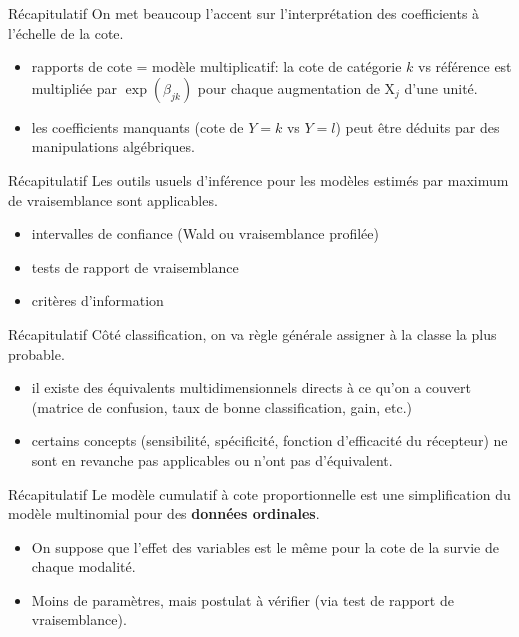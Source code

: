 \documentclass[
  ignorenonframetext,
]{beamer}
\providecommand{\tightlist}{%
  \setlength{\itemsep}{0pt}\setlength{\parskip}{0pt}}\usepackage{longtable,booktabs,array}
\begin{document}
\begin{frame}{Récapitulatif}
\protect\hypertarget{ruxe9capitulatif-2}{}
On met beaucoup l'accent sur l'interprétation des coefficients à
l'échelle de la cote.

\begin{itemize}
\tightlist
\item
  rapports de cote = modèle multiplicatif: la cote de catégorie \(k\) vs
  référence est multipliée par \(\exp(\beta_{jk})\) pour chaque
  augmentation de \(\mathrm{X}_j\) d'une unité.
\item
  les coefficients manquants (cote de \(Y=k\) vs \(Y=l\)) peut être
  déduits par des manipulations algébriques.
\end{itemize}
\end{frame}

\begin{frame}{Récapitulatif}
\protect\hypertarget{ruxe9capitulatif-3}{}
Les outils usuels d'inférence pour les modèles estimés par maximum de
vraisemblance sont applicables.

\begin{itemize}
\tightlist
\item
  intervalles de confiance (Wald ou vraisemblance profilée)
\item
  tests de rapport de vraisemblance
\item
  critères d'information
\end{itemize}
\end{frame}

\begin{frame}{Récapitulatif}
\protect\hypertarget{ruxe9capitulatif-4}{}
Côté classification, on va règle générale assigner à la classe la plus
probable.

\begin{itemize}
\tightlist
\item
  il existe des équivalents multidimensionnels directs à ce qu'on a
  couvert (matrice de confusion, taux de bonne classification, gain,
  etc.)
\item
  certains concepts (sensibilité, spécificité, fonction d'efficacité du
  récepteur) ne sont en revanche pas applicables ou n'ont pas
  d'équivalent.
\end{itemize}
\end{frame}

\begin{frame}{Récapitulatif}
\protect\hypertarget{ruxe9capitulatif-5}{}
Le modèle cumulatif à cote proportionnelle est une simplification du
modèle multinomial pour des \textbf{données ordinales}.

\begin{itemize}
\tightlist
\item
  On suppose que l'effet des variables est le même pour la cote de la
  survie de chaque modalité.
\item
  Moins de paramètres, mais postulat à vérifier (via test de rapport de
  vraisemblance).
\end{itemize}
\end{frame}
\end{document}
